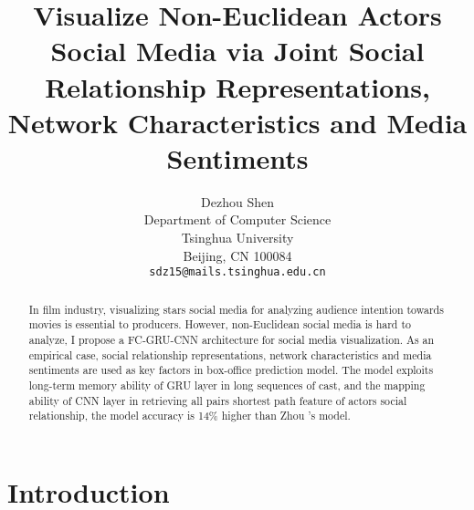 \documentclass[review]{cvpr}
\begin{document}
\title{Visualize Non-Euclidean Actors Social Media via Joint Social Relationship Representations, Network Characteristics and Media Sentiments}

\author{Dezhou Shen\\
Department of Computer Science\\
Tsinghua University\\
Beijing, CN 100084\\
{\tt\small sdz15@mails.tsinghua.edu.cn}
}

\maketitle


\begin{abstract}
  In film industry, visualizing stars social media for analyzing audience intention towards movies is essential to producers.
  However, non-Euclidean social media is hard to analyze, I propose a FC-GRU-CNN architecture for social media visualization.
  As an empirical case, social relationship representations, network characteristics and media sentiments are used as key factors in box-office prediction model.
  The model exploits long-term memory ability of GRU layer in long sequences of cast,
  and the mapping ability of CNN layer in retrieving all pairs shortest path feature of actors social relationship,
  the model accuracy is 14\% higher than Zhou \etal's model.
\end{abstract}

\section{Introduction}
\end{document}
